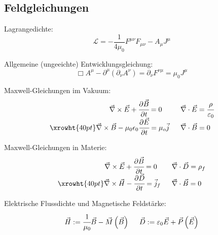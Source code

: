 \documentclass[11pt]{article}
\numberwithin{equation}{section}
\begin{document}
		\subsection{Feldgleichungen}
      Lagrangedichte:
      \begin{equation}
        \mathcal{L} = -\frac{1}{4\mu_0}F^{\mu\nu} F_{\mu\nu} - A_\mu J^\mu
      \end{equation}

      Allgemeine (ungeeichte) Entwicklungsgleichung:
      \begin{equation}
        \Box A^\mu-\partial^\mu\left(\partial_\nu A^\nu\right) = \partial_\nu F^{\nu\mu} =  \mu_0 J^\mu
      \end{equation}

			Maxwell-Gleichungen im Vakuum:
			\begin{equation}
			\begin{array}{rl}
				\vec{\nabla}\times \vec{E} + \cfrac{\partial\vec{B}}{\partial t} = 0 \phantom{\mu_0}
				&\;\; \vec{\nabla}\cdot\vec{E} = \cfrac{\rho}{\varepsilon_0} \\ \xrowht{40pt}
				\vec{\nabla}\times\vec{B} - \mu_0 \epsilon_0 \cfrac{\partial \vec{E}}{\partial t} = \mu_o\vec{j}
				&\;\; \vec{\nabla}\cdot\vec{B} = 0 \\
			\end{array}
			\end{equation}

			Maxwell-Gleichungen in Materie:
			\begin{equation}
			\begin{array}{rl}
				\vec{\nabla}\times \vec{E} + \cfrac{\partial\vec{B}}{\partial t} = 0 \phantom{_f}
				&\;\; \vec{\nabla}\cdot\vec{D} = \rho_f\\ \xrowht{40pt}
				\vec{\nabla}\times\vec{H} - \cfrac{\partial \vec{D}}{\partial t} = \vec{j}_f
				&\;\; \vec{\nabla}\cdot\vec{B} = 0 \\
			\end{array}
			\end{equation}

			Elektrische Flussdichte und Magnetische Feldstärke:
			\begin{equation} \label{eq:flussdichte-feldstärke}
  			\begin{array}{cc}
  				\vec{H} := \cfrac{1}{\mu_0}\Vec{B} - \vec{M}\left(\vec{B}\right)
  				&\;\; \vec{D} := \varepsilon_0\vec{E} + \vec{P}\left(\vec{E}\right)
  			\end{array}
			\end{equation}
\end{document}
